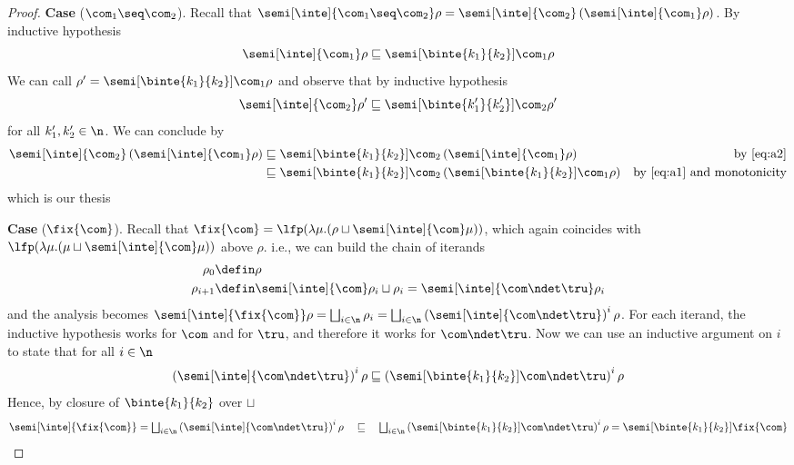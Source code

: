 \begin{proof}
  \noindent
  \textbf{Case} (\(\com_1 \seq \com_2\)).
  Recall that
  \({\semi[\inte]{\com_1 \seq \com_2}\rho} =
  {\semi[\inte]{\com_2}\left(\semi[\inte]{\com_1}\rho\right)}\). By
  inductive hypothesis
  \begin{equation}\label{eq:a1}
    {\semi[\inte]{\com_1}\rho} \sqsubseteq {\semi[\binte{k_1}{k_2}]{\com_1}\rho}
  \end{equation}
  We can call \(\rho' = {\semi[\binte{k_1}{k_2}]{\com_1}\rho}\) and observe
  that by inductive hypothesis
  \begin{equation}\label{eq:a2} {\semi[\inte]{\com_2}\rho'}
    \sqsubseteq {\semi[\binte{k_1'}{k_2'}]{\com_2}\rho'}
  \end{equation}
  for all \(k_1',k_2'\in\n\). We can conclude by
  \begin{align*}
    {\semi[\inte]{\com_2}\left(\semi[\inte]{\com_1}\rho\right)} & \sqsubseteq {\semi[\binte{k_1}{k_2}]{\com_2}\left(\semi[\inte]{\com_1}\rho\right)} & \text{by \eqref{eq:a2}}\\
                                                                & \sqsubseteq {\semi[\binte{k_1}{k_2}]{\com_2}\left(\semi[\binte{k_1}{k_2}]{\com_1}\rho\right)} & \text{by \eqref{eq:a1} and monotonicity}
  \end{align*}
  which is our thesis

  \medskip

  \noindent
  \textbf{Case} (\(\fix{\com}\)).
  Recall that
  \(\fix{\com} = {\lfp(\lambda \mu . (\rho \sqcup
    \semi[\inte]{\com}\mu))}\), which again coincides with
  \({\lfp(\lambda \mu . (\mu \sqcup \semi[\inte]{\com}\mu))}\) above
  \(\rho\). i.e., we can build the chain of iterands
  \begin{align*}
    \rho_0 & \defin \rho \\
    \rho_{i+1} & \defin \semi[\inte]{\com}\rho_i \sqcup \rho_i = \semi[\inte]{\com \ndet \tru}\rho_i
  \end{align*}
  and the analysis becomes
  \({\semi[\inte]{\fix{\com}}\rho} =
  {\textstyle\bigsqcup_{i\in\n}\rho_i} =
  {\textstyle\bigsqcup_{i\in\n}\left(\semi[\inte]{\com \ndet
        \tru}\right)^i\rho}\).  For each iterand, the inductive
  hypothesis works for \(\com\) and for \(\tru\), and therefore it
  works for \(\com \ndet \tru\). Now we can use an inductive argument
  on \(i\) to state that for all \(i \in\n\)
  \begin{equation*}
    {\left(\semi[\inte]{\com\ndet\tru}\right)^i\rho} \sqsubseteq {\left(\semi[\binte{k_1}{k_2}]{\com\ndet\tru}\right)^i\rho}
  \end{equation*}
  Hence, by closure of \(\binte{k_1}{k_2}\) over \(\sqcup\)
  \begin{equation*}
    {\semi[\inte]{\fix{\com}}} =
    {\textstyle\bigsqcup_{i\in\n}\left(\semi[\inte]{\com\ndet\tru}\right)^i \rho}
    \quad \sqsubseteq \quad
    {\textstyle\bigsqcup_{i\in\n}\left(\semi[\binte{k_1}{k_2}]{\com\ndet\tru}\right)^i \rho} =
    {\semi[\binte{k_1}{k_2}]{\fix{\com}}}
  \end{equation*}

\end{proof}
